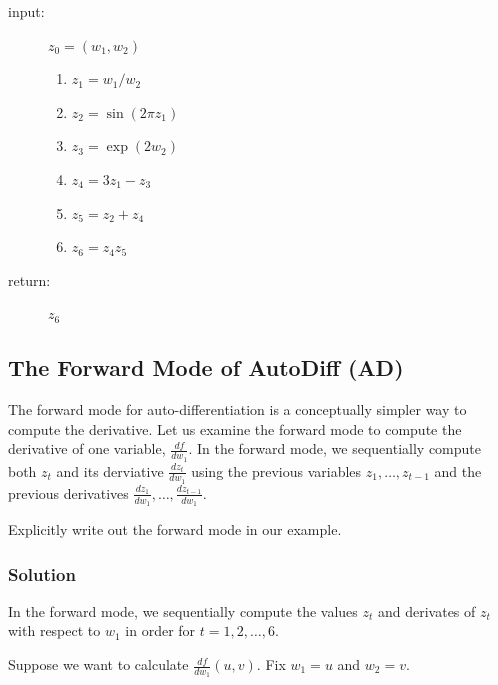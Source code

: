 \documentclass[letterpaper,11pt]{article}
\begin{document}
\begin{description}
\item[input:] $z_0 = \left(w_1,w_2\right)$
  \begin{enumerate}
  \item $z_1 = w_1/w_2$
  \item $z_2 = \sin\left(2\pi z_1\right)$
  \item $z_3 = \exp\left(2w_2\right)$
  \item $z_4 = 3z_1 - z_3$
  \item $z_5 = z_2 + z_4$
  \item $z_6 = z_4z_5$
  \end{enumerate}
\item[return:] $z_6$
\end{description}

\subsection*{The Forward Mode of AutoDiff (AD)}

The forward mode for auto-differentiation is a conceptually simpler
way to compute the derivative. Let us examine the forward mode to
compute the derivative of one variable, $\frac{df}{dw_1}$. In the
forward mode, we sequentially compute both $z_t$ and its derviative
$\frac{dz_t}{dw_1}$ using the previous variables $z_1,\ldots,z_{t-1}$
and the previous derivatives
$\frac{dz_1}{dw_1},\ldots,\frac{dz_{t-1}}{dw_1}$.

Explicitly write out the forward mode in our example.

\subsubsection*{Solution}

In the forward mode, we sequentially compute the values $z_t$ and derivates of
$z_t$ with respect to $w_1$ in order for $t = 1,2,\ldots,6$.

Suppose we want to calculate $\frac{df}{dw_1}(u,v)$. Fix $w_1 = u$ and
$w_2 = v$.
\end{document}
